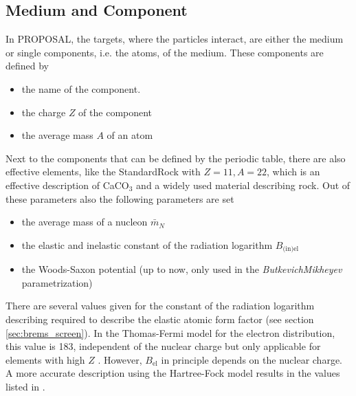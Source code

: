 %

\subsection{Medium and Component} \label{sec:medium}

In PROPOSAL, the targets, where the particles interact, are either the medium or single components, i.e. the atoms, of the medium.
These components are defined by 
\begin{itemize}
    \item the name of the component.
    \item the charge $Z$ of the component
    \item the average mass $A$ of an atom
\end{itemize}
Next to the components that can be defined by the periodic table, there are also effective elements, like the StandardRock with $Z=11, A=22$, which is an effective description of CaCO$_3$ and a widely used material describing rock.
Out of these parameters also the following parameters are set
\begin{itemize}
    \item the average mass of a nucleon $\bar{m}_N$
    \item the elastic and inelastic constant of the radiation logarithm $B_{\text{(in)el}}$
    \item the Woods-Saxon potential (up to now, only used in the \textit{ButkevichMikheyev} parametrization)
\end{itemize}
There are several values given for the constant of the radiation logarithm describing required to describe the elastic atomic form factor (see section \ref{sec:brems_screen}).
In the Thomas-Fermi model for the electron distribution, this value is \num{183}, independent of the nuclear charge but only applicable for elements with high $Z$ \cite{Bethe34a, Bethe34b}.
However, $B_{\text{el}}$ in principle depends on the nuclear charge.
A more accurate description using the Hartree-Fock model \cite{Kelner99RadLog} results in the values listed in .

